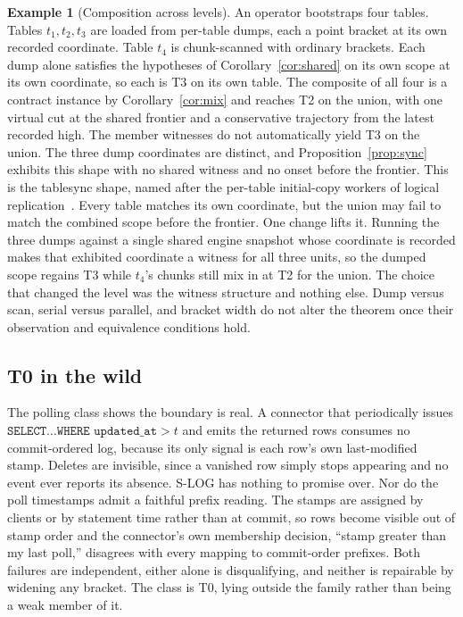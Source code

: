 \documentclass[sigconf,nonacm,10pt]{acmart}
\theoremstyle{plain}
\theoremstyle{definition}
\newtheorem{example}{Example}[section]
\begin{document}
\begin{example}[Composition across levels]\label{ex:tiers}
An operator bootstraps four tables. Tables $t_1, t_2, t_3$ are
loaded from per-table dumps, each a point bracket at its own
recorded coordinate. Table $t_4$ is chunk-scanned with ordinary
brackets. Each dump alone satisfies the hypotheses of Corollary~\ref{cor:shared} 
on its own scope at its own 
coordinate, so each is T3 on its own table. The composite of all
four is a contract instance by Corollary~\ref{cor:mix} and reaches
T2 on the union, with one virtual cut at the shared frontier and a
conservative trajectory from the latest recorded high. The member
witnesses do not automatically yield T3 on the union. The three dump
coordinates are distinct, and Proposition~\ref{prop:sync} exhibits
this shape with no shared witness and no onset before the frontier.
This is the tablesync shape, named
after the per-table initial-copy workers of logical
replication~\cite{postgres_logical_replication}. Every table matches
its own coordinate, but the union may fail to match the combined scope
before the frontier. One change lifts it. Running the three dumps against a single
shared engine snapshot whose coordinate is recorded makes that
exhibited coordinate a witness for
all three units, so the dumped scope regains T3 while $t_4$'s chunks
still mix in at T2 for the union. The choice that changed the level
was the witness structure and nothing else. Dump versus scan,
serial versus parallel, and bracket width do not alter the theorem
once their observation and equivalence conditions hold.
\end{example}

\subsection{T0 in the wild}\label{sec:tiers-t0}

The polling class shows the boundary is real. A connector that
periodically issues
$\texttt{SELECT} \ldots \texttt{WHERE updated\_at} > t$ and emits
the returned rows consumes no commit-ordered log, because its only
signal is each row's own last-modified stamp. Deletes are invisible,
since a vanished row simply stops appearing and no event ever
reports its absence. S-LOG has nothing to promise over. Nor do the
poll timestamps admit a faithful prefix reading. The stamps are
assigned by clients or by statement time rather than at commit, so
rows become visible out of stamp order and the connector's own
membership decision, ``stamp greater than my last poll,''
disagrees with every mapping to commit-order prefixes. Both failures are
independent, either alone is disqualifying, and neither is
repairable by widening any bracket. The class is T0, lying outside the family rather than being a weak member of it.
\end{document}
